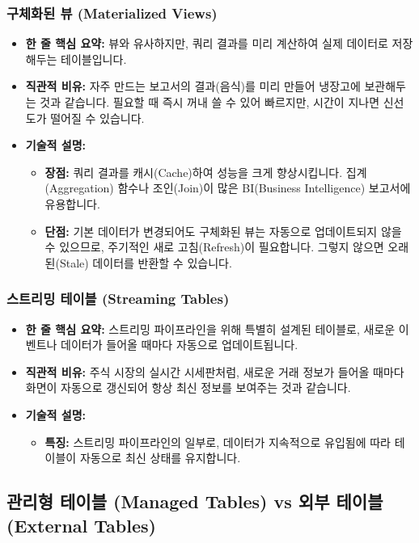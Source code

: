 \documentclass[11pt,a4paper]{article}
\begin{document}
\subsubsection{구체화된 뷰 (Materialized Views)}
\begin{itemize}
    \item \textbf{한 줄 핵심 요약:} 뷰와 유사하지만, 쿼리 결과를 미리 계산하여 실제 데이터로 저장해두는 테이블입니다.
    \item \textbf{직관적 비유:} 자주 만드는 보고서의 결과(음식)를 미리 만들어 냉장고에 보관해두는 것과 같습니다. 필요할 때 즉시 꺼내 쓸 수 있어 빠르지만, 시간이 지나면 신선도가 떨어질 수 있습니다.
    \item \textbf{기술적 설명:}
    \begin{itemize}
        \item \textbf{장점:} 쿼리 결과를 캐시(Cache)하여 성능을 크게 향상시킵니다. 집계(Aggregation) 함수나 조인(Join)이 많은 BI(Business Intelligence) 보고서에 유용합니다.
        \item \textbf{단점:} 기본 데이터가 변경되어도 구체화된 뷰는 자동으로 업데이트되지 않을 수 있으므로, 주기적인 새로 고침(Refresh)이 필요합니다. 그렇지 않으면 오래된(Stale) 데이터를 반환할 수 있습니다.
    \end{itemize}
\end{itemize}

\subsubsection{스트리밍 테이블 (Streaming Tables)}
\begin{itemize}
    \item \textbf{한 줄 핵심 요약:} 스트리밍 파이프라인을 위해 특별히 설계된 테이블로, 새로운 이벤트나 데이터가 들어올 때마다 자동으로 업데이트됩니다.
    \item \textbf{직관적 비유:} 주식 시장의 실시간 시세판처럼, 새로운 거래 정보가 들어올 때마다 화면이 자동으로 갱신되어 항상 최신 정보를 보여주는 것과 같습니다.
    \item \textbf{기술적 설명:}
    \begin{itemize}
        \item \textbf{특징:} 스트리밍 파이프라인의 일부로, 데이터가 지속적으로 유입됨에 따라 테이블이 자동으로 최신 상태를 유지합니다.
    \end{itemize}
\end{itemize}

\subsection{관리형 테이블 (Managed Tables) vs 외부 테이블 (External Tables)}
\end{document}
